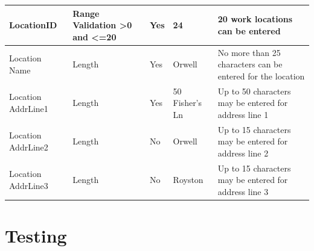 \begin{center}
\begin{longtable}{|p{2.5cm}|p{2cm}|p{3cm}|p{3cm}|p{3cm}|}
LocationID 		&Range Validation \textgreater0 and \textless=20	&Yes	& 	24	& 20 work locations can be entered		\\ \hline
Location Name	& Length	&Yes	&	Orwell	 & No more than 25 characters can be entered for the location  \\ \hline
Location AddrLine1 & Length	&Yes	&	50 Fisher's Ln	 & Up to 50 characters may be entered for address line 1  \\ \hline
Location AddrLine2 & Length	&No	&	Orwell	 & Up to 15 characters may be entered for address line 2 \\ \hline
Location AddrLine3  & Length	&No	&	Royston 	 &Up to 15 characters may be entered for address line 3  \\ \hline
    \end{longtable}
\end{center}

\section{Testing}

